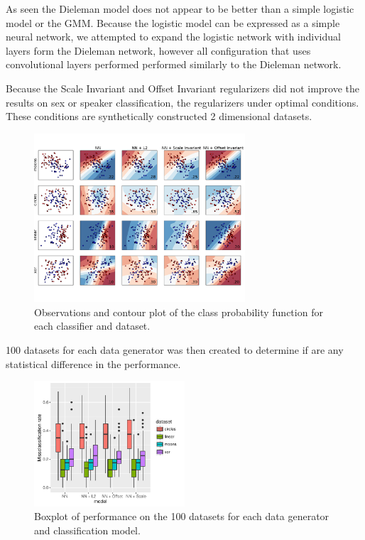 As seen the Dieleman model does not appear to be better than a simple logistic model or the GMM. Because the logistic model can be expressed as a simple neural network, we attempted to expand the logistic network with individual layers form the Dieleman network, however all configuration that uses convolutional layers performed performed similarly to the Dieleman network.

Because the Scale Invariant and Offset Invariant regularizers did not improve the results on sex or speaker classification, the regularizers under optimal conditions. These conditions are synthetically constructed 2 dimensional datasets. 

\begin{figure}[h]
	\centering
	\includegraphics[width=0.7\textwidth, trim = 0 2.2cm 0 1.5cm, clip]{plots/2d_classifier}
	\caption{Observations and contour plot of the class probability function for each classifier and dataset.}
\end{figure}

100 datasets for each data generator was then created to determine if are any statistical difference in the performance.

\begin{figure}[H]
	\centering
	\includegraphics[width=0.5\textwidth]{plots/2d_significant}
	\caption{Boxplot of performance on the 100 datasets for each data generator and classification model.}
\end{figure}

